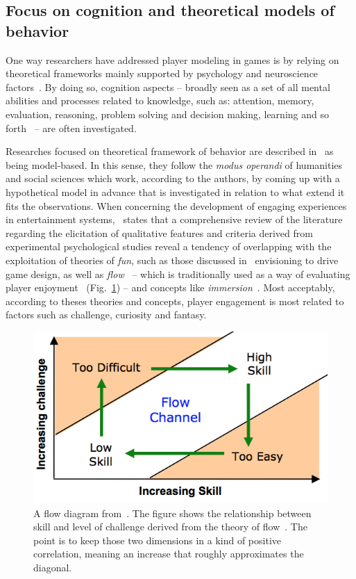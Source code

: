 \subsection{Focus on cognition and theoretical models of behavior}
One way researchers have addressed player modeling in games is by relying on theoretical frameworks mainly supported by psychology and neuroscience factors~\cite{yannakakis_player_2013}. By doing so, cognition aspects -- broadly seen as a set of all mental abilities and processes related to knowledge, such as: attention, memory, evaluation, reasoning, problem solving and decision making, learning and so forth~\cite{wiki:cognition} -- are often investigated. 

Researches focused on theoretical framework of behavior are described in~\cite{yannakakis_player_2013} as being model-based. In this sense, they follow the \textit{modus operandi} of humanities and social sciences which work, according to the authors, by coming up with a hypothetical model in advance that is investigated in relation to what extend it fits the observations. When concerning the development of engaging experiences in entertainment systems,~\cite{yannakakis_how_2008} states that a comprehensive review of the literature regarding the elicitation of qualitative features and criteria derived from experimental psychological studies reveal a tendency of overlapping with the exploitation of theories of \textit{fun}, such as those discussed in~\cite{malone_what_1980, lazzaro_why_2004, koster_theory_2013} envisioning to drive game design, as well as \textit{flow}~\cite{csikszentmihalyi_flow:_1991} -- which is traditionally used as a way of evaluating player enjoyment~\cite{sweetser_gameflow:_2005, cowley_toward_2008} (Fig.~\ref{flowDiagram}) -- and concepts like \textit{immersion}~\cite{calleja_digital_2007}. Most acceptably, according to theses theories and concepts, player engagement is most related to factors such as challenge, curiosity and fantasy.

\begin{figure}[htp]
  \centering  
  \includegraphics[]{images/02-art/flowDiagram.png}
  \caption{A flow diagram from~\cite{hunicke_ai_2004}. The figure shows the relationship between skill and level of challenge derived from the theory of flow~\cite{csikszentmihalyi_flow:_1991}. The point is to keep those two dimensions in a kind of positive correlation, meaning an increase that roughly approximates the diagonal.}
   \label{flowDiagram}
\end{figure}

